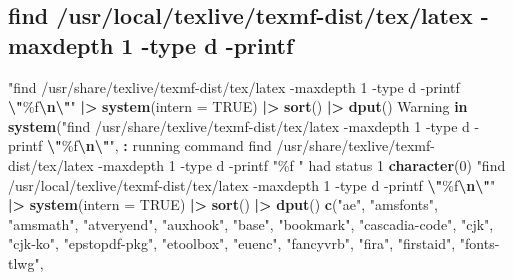 \documentclass[
]{article}
\newenvironment{Shaded}{\begin{snugshade}}{\end{snugshade}}
\newcommand{\AttributeTok}[1]{\textcolor[rgb]{0.13,0.29,0.53}{#1}}
\newcommand{\ConstantTok}[1]{\textcolor[rgb]{0.56,0.35,0.01}{#1}}
\newcommand{\ControlFlowTok}[1]{\textcolor[rgb]{0.13,0.29,0.53}{\textbf{#1}}}
\newcommand{\DecValTok}[1]{\textcolor[rgb]{0.00,0.00,0.81}{#1}}
\newcommand{\FunctionTok}[1]{\textcolor[rgb]{0.13,0.29,0.53}{\textbf{#1}}}
\newcommand{\NormalTok}[1]{#1}
\newcommand{\SpecialCharTok}[1]{\textcolor[rgb]{0.81,0.36,0.00}{\textbf{#1}}}
\newcommand{\StringTok}[1]{\textcolor[rgb]{0.31,0.60,0.02}{#1}}
\begin{document}
\hypertarget{find-usrlocaltexlivetexmf-disttexlatex--maxdepth-1--type-d--printf}{%
\subsection{find /usr/local/texlive/texmf-dist/tex/latex -maxdepth 1
-type d
-printf}\label{find-usrlocaltexlivetexmf-disttexlatex--maxdepth-1--type-d--printf}}

\begin{Shaded}
\begin{Highlighting}[]
\StringTok{"find /usr/share/texlive/texmf{-}dist/tex/latex {-}maxdepth 1 {-}type d {-}printf }\SpecialCharTok{\textbackslash{}"}\StringTok{\%f}\SpecialCharTok{\textbackslash{}n\textbackslash{}"}\StringTok{"} \SpecialCharTok{|\textgreater{}}
    \FunctionTok{system}\NormalTok{(}\AttributeTok{intern =} \ConstantTok{TRUE}\NormalTok{) }\SpecialCharTok{|\textgreater{}}
    \FunctionTok{sort}\NormalTok{() }\SpecialCharTok{|\textgreater{}}
    \FunctionTok{dput}\NormalTok{()}
\NormalTok{Warning }\ControlFlowTok{in} \FunctionTok{system}\NormalTok{(}\StringTok{"find /usr/share/texlive/texmf{-}dist/tex/latex {-}maxdepth 1 {-}type d {-}printf }\SpecialCharTok{\textbackslash{}"}\StringTok{\%f}\SpecialCharTok{\textbackslash{}n\textbackslash{}"}\StringTok{"}\NormalTok{, }\SpecialCharTok{:}\NormalTok{ running command }\StringTok{\textquotesingle{}find /usr/share/texlive/texmf{-}dist/tex/latex {-}maxdepth 1 {-}type d {-}printf "\%f}
\StringTok{"\textquotesingle{}}\NormalTok{ had status }\DecValTok{1}
\FunctionTok{character}\NormalTok{(}\DecValTok{0}\NormalTok{)}
\StringTok{"find /usr/local/texlive/texmf{-}dist/tex/latex {-}maxdepth 1 {-}type d {-}printf }\SpecialCharTok{\textbackslash{}"}\StringTok{\%f}\SpecialCharTok{\textbackslash{}n\textbackslash{}"}\StringTok{"} \SpecialCharTok{|\textgreater{}}
    \FunctionTok{system}\NormalTok{(}\AttributeTok{intern =} \ConstantTok{TRUE}\NormalTok{) }\SpecialCharTok{|\textgreater{}}
    \FunctionTok{sort}\NormalTok{() }\SpecialCharTok{|\textgreater{}}
    \FunctionTok{dput}\NormalTok{()}
\FunctionTok{c}\NormalTok{(}\StringTok{"ae"}\NormalTok{, }\StringTok{"amsfonts"}\NormalTok{, }\StringTok{"amsmath"}\NormalTok{, }\StringTok{"atveryend"}\NormalTok{, }\StringTok{"auxhook"}\NormalTok{, }\StringTok{"base"}\NormalTok{, }
\StringTok{"bookmark"}\NormalTok{, }\StringTok{"cascadia{-}code"}\NormalTok{, }\StringTok{"cjk"}\NormalTok{, }\StringTok{"cjk{-}ko"}\NormalTok{, }\StringTok{"epstopdf{-}pkg"}\NormalTok{, }
\StringTok{"etoolbox"}\NormalTok{, }\StringTok{"euenc"}\NormalTok{, }\StringTok{"fancyvrb"}\NormalTok{, }\StringTok{"fira"}\NormalTok{, }\StringTok{"firstaid"}\NormalTok{, }\StringTok{"fonts{-}tlwg"}\NormalTok{, }

\end{Highlighting}
\end{Shaded}
\end{document}
